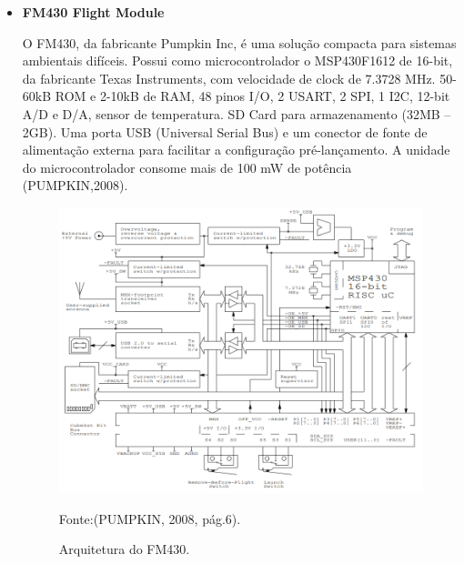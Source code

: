 \begin{itemize}
\newpage
\item \textbf{FM430 Flight Module}

O FM430, da fabricante Pumpkin Inc, é uma solução compacta para sistemas ambientais difíceis. Possui como microcontrolador o MSP430F1612 de 16-bit, da fabricante Texas Instruments, com velocidade de clock de 7.3728 MHz. 50-60kB ROM e 2-10kB de RAM, 48 pinos I/O, 2 USART, 2 SPI, 1 I2C, 12-bit A/D e D/A, sensor de temperatura. SD Card para armazenamento (32MB – 2GB). Uma porta USB (Universal Serial Bus) e um conector de fonte de alimentação externa para facilitar a configuração pré-lançamento. A unidade do microcontrolador consome mais de 100 mW de potência (PUMPKIN,2008).

\begin{figure}[h]
	\centering
	\caption{Arquitetura do FM430.}
	
\includegraphics[keepaspectratio=true,scale=0.55]{figuras/fm430.PNG}
	
	Fonte:(PUMPKIN, 2008, pág.6).\linebreak
	\label{fig15}
\end{figure}

\end{itemize}

